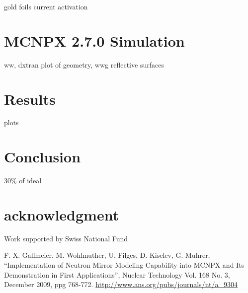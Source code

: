 \documentclass[a4paper,
              ]{jacow}
\begin{document}
gold foils
current
activation

\section{MCNPX 2.7.0 Simulation}

ww, dxtran
plot of geometry, wwg
reflective surfaces


\section{Results}

plots


\section{Conclusion}

30\% of ideal


\section{acknowledgment}

Work supported by Swiss National Fund



\begin{thebibliography}{99} %

	F. X. Gallmeier, M. Wohlmuther, U. Filges, D. Kiselev, G. Muhrer,
	``Implementation of Neutron Mirror Modeling Capability into MCNPX and Its Demonstration in First Applications'',
  Nuclear Technology Vol. 168 No. 3, December 2009, ppg 768-772.
	\url{http://www.ans.org/pubs/journals/nt/a_9304}

\end{thebibliography}
\end{document}
